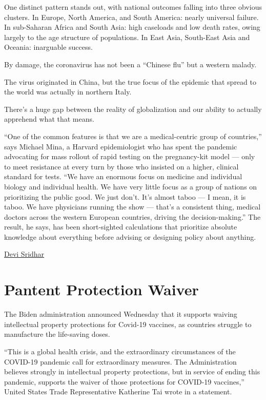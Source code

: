 \documentclass[
]{book}
\begin{document}
One distinct pattern stands out, with national outcomes falling into three obvious clusters.
In Europe, North America, and South America: nearly universal failure.
In sub-Saharan Africa and South Asia: high caseloads and low death rates,
owing largely to the age structure of populations.
In East Asia, South-East Asia and Oceania: inarguable success.

By damage, the coronavirus has not been a ``Chinese flu'' but a western malady.

The virus originated in China, but the true focus of the epidemic that spread to the world
was actually in northern Italy.

There's a huge gap between the reality of globalization and our ability to actually apprehend what that means.

``One of the common features is that we are a medical-centric group of countries,'' says Michael Mina, a Harvard epidemiologist who has spent the pandemic advocating for mass rollout of rapid testing on the pregnancy-kit model --- only to meet resistance at every turn by those who insisted on a higher, clinical standard for tests. ``We have an enormous focus on medicine and individual biology and individual health. We have very little focus as a group of nations on prioritizing the public good. We just don't. It's almost taboo --- I mean, it is taboo. We have physicians running the show --- that's a consistent thing, medical doctors across the western European countries, driving the decision-making.'' The result, he says, has been short-sighted calculations that prioritize absolute knowledge about everything before advising or designing policy about anything.

\href{https://nymag.com/intelligencer/2021/03/how-the-west-lost-covid-19.html}{Devi Sridhar}

\hypertarget{pantent-protection-waiver}{%
\section{Pantent Protection Waiver}\label{pantent-protection-waiver}}

The Biden administration announced Wednesday that it supports waiving intellectual property protections for Covid-19 vaccines, as countries struggle to manufacture the life-saving doses.

``This is a global health crisis, and the extraordinary circumstances of the COVID-19 pandemic call for extraordinary measures. The Administration believes strongly in intellectual property protections, but in service of ending this pandemic, supports the waiver of those protections for COVID-19 vaccines,'' United States Trade Representative Katherine Tai wrote in a statement.
\end{document}
